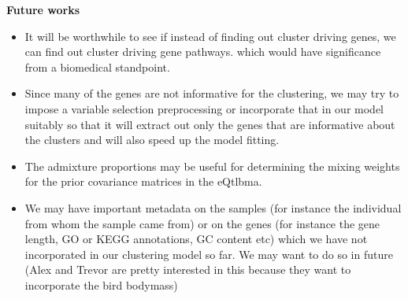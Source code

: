 \textbf{Future works}

\begin{itemize}
\item It will be worthwhile to see if instead of finding out cluster driving genes, we can find out cluster driving gene pathways. which would have significance from a biomedical standpoint. 

\item Since many of the genes are not informative for the clustering, we may try to impose a variable selection preprocessing or incorporate that in our model suitably so that it will extract out only the genes that are informative about the clusters and will also speed up the  model fitting. 

\item The admixture proportions may be useful for determining the mixing weights for the prior covariance matrices in the eQtlbma. 

\item We may have important metadata on the samples (for instance the individual from whom the sample came from) or on the genes (for instance the gene length, GO or KEGG annotations, GC content etc) which we have not incorporated in our clustering model so far. We may want to do so in future (Alex and Trevor are pretty interested in this because they want to incorporate the bird bodymass)

\end{itemize}





